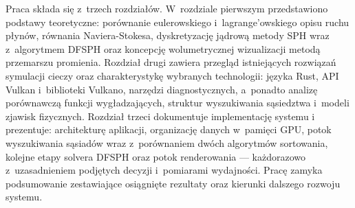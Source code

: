 Praca składa się z~trzech rozdziałów. W~rozdziale pierwszym przedstawiono
podstawy teoretyczne: porównanie eulerowskiego i~lagrange'owskiego opisu ruchu
płynów, równania Naviera-Stokesa, dyskretyzację jądrową metody SPH wraz
z~algorytmem DFSPH oraz koncepcję wolumetrycznej wizualizacji metodą przemarszu
promienia. Rozdział drugi zawiera przegląd istniejących rozwiązań symulacji
cieczy oraz charakterystykę wybranych technologii: języka Rust, API Vulkan
i~biblioteki Vulkano, narzędzi diagnostycznych, a~ponadto analizę porównawczą
funkcji wygładzających, struktur wyszukiwania sąsiedztwa i~modeli zjawisk
fizycznych. Rozdział trzeci dokumentuje implementację systemu i prezentuje:
architekturę aplikacji, organizację danych w~pamięci GPU, potok wyszukiwania sąsiadów wraz
z~porównaniem dwóch algorytmów sortowania, kolejne etapy solvera DFSPH oraz
potok renderowania --- każdorazowo z~uzasadnieniem podjętych decyzji
i~pomiarami wydajności. Pracę zamyka podsumowanie zestawiające osiągnięte
rezultaty oraz kierunki dalszego rozwoju systemu.
